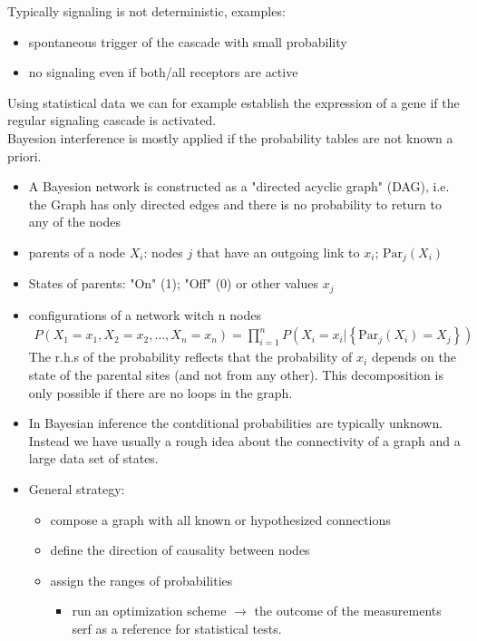 Typically signaling is not deterministic, examples:
\begin{itemize}[label={$\to$}]
\item spontaneous trigger of the cascade with small probability
\item no signaling even if both/all receptors are active
\end{itemize}
Using statistical data we can for example establish the expression of a gene if the regular signaling cascade is activated.\\
Bayesion interference is mostly applied if the probability tables are not known a priori.
\begin{itemize}[label={$-$}]
\item A Bayesion network is constructed as a "directed acyclic graph" (DAG), i.e. the Graph has only directed edges and there is no probability to return to any of the nodes
\item parents of a node $X_i$: nodes $j$ that have an outgoing link to $x_i$; $\text{Par}_j(X_i)$
\item States of parents: "{}On" (1); "{}Off" (0) or other values $x_j$
\item configurations of a network witch n nodes
\begin{align*}
P(X_1=x_1,X_2=x_2,\ldots ,X_n=x_n)=\prod\limits_{i=1}^nP(X_i=x_i|\left\{\text{Par}_j(X_i)=X_j\right\})
\end{align*}
The r.h.s of the probability reflects that the probability of $x_i$ depends on the state of the parental sites (and not from any other). This decomposition is only possible if there are no loops in the graph.
\item In Bayesian inference the contditional probabilities are typically unknown. Instead we have usually a rough idea about the connectivity of a graph and a large data set of states.
\item General strategy:
\begin{itemize}[label={}]
\item compose a graph with all known or hypothesized connections
\item define the direction of causality between nodes
\item assign the ranges of probabilities
\begin{itemize}[label={$\to$}]
\item run an optimization scheme $\to$ the outcome of the measurements serf as a reference for statistical tests.
\end{itemize}
\end{itemize}
\end{itemize}
